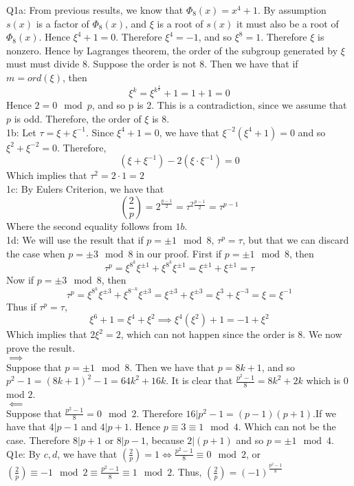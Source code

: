\documentclass[letterpaper]{article}
\begin{document}
\noindent Q1a: From previous results, we know that $\Phi_8(x) = x^4+1$. By assumption $s(x)$ is a factor of $\Phi_8(x)$, and $\xi$ is a root of $s(x)$ it must also be a root of $\Phi_8(x)$. Hence $\xi^4+1=0$. Therefore $\xi^4 = -1$, and so $\xi^8=1$. Therefore $\xi$ is nonzero. Hence by Lagranges theorem, the order of the subgroup generated by $\xi$ must must divide 8. Suppose the order is not 8. Then we have that if $m=ord(\xi)$, then $$\xi^k = \xi^{k^{\frac{4}{k}}}+1=1+1=0$$
Hence $2 = 0\mod{p}$, and so p is 2. This is a contradiction, since we assume that $p$ is odd. Therefore, the order of $\xi$ is 8. 
\newline \\ 1b: Let $\tau = \xi+ \xi^{-1}$. Since $\xi^4+1=0$, we have that $\xi^{-2}(\xi^4+1)=0$ and so $\xi^2+\xi^{-2}=0$. Therefore, $$(\xi+\xi^{-1})-2(\xi\cdot \xi^{-1})=0$$ Which implies that $\tau^2=2\cdot 1 = 2$ 
\newline \\ 1c: By Eulers Criterion, we have that $$(\frac{2}{p}) = 2^{\frac{p-1}{2}} = \tau^{2\frac{p-1}{2}} = \tau^{p-1}$$ Where the second equality follows from $1b$. 
\newline \\ 1d: We will use the result that if $p = \pm 1 \mod{8}$, $\tau^p=\tau$, but that we can discard the case when $p = \pm 3\mod{8}$ in our proof. First if $p=\pm 1\mod{8}$, then $$\tau^p = \xi^{8^k}\xi^{\pm 1}+ \xi^{8^k}\xi^{\pm 1} = \xi^{\pm 1} + \xi^{\pm 1} = \tau$$ Now if $p = \pm 3 \mod{8}$, then $$\tau^p = \xi^{8^k}\xi^{\pm 3} + \xi^{8^{-k}}\xi^{\pm 3} = \xi^{\pm 3} + \xi^{\pm 3} =\xi^3 + \xi^{-3} = \xi = \xi^{-1}$$
Thus if $\tau^p=\tau$, $$\xi^6+1 = \xi^4 + \xi^2 \implies \xi^4(\xi^2)+1 = -1+\xi^2$$
Which implies that $2\xi^2=2$, which can not happen since the order is 8. We now prove the result. 
\newline \\ $\implies$
\newline \\ Suppose that $p = \pm 1 \mod{8}$. Then we have that $p=8k+1$, and so $p^2-1= (8k+1)^2-1 = 64k^2+16k$. It is clear that $\frac{p^2-1}{8} = 8k^2+2k$ which is 0 mod $2$. 
\newline \\ $\impliedby$
\newline \\ Suppose that $\frac{p^2-1}{8} = 0\mod{2}$. Therefore $16|p^2-1 = (p-1)(p+1)$.If we have that $4|p-1$ and $4|p+1$. Hence $p\equiv 3\equiv 1\mod{4}$. Which can not be the case. Therefore $8|p+1$ or $8|p-1$, because $2|(p+1)$ and so $p = \pm 1 \mod{4}$. 
\newline \\ Q1e: By $c,d$, we have that $(\frac{2}{p})=1 \iff \frac{p^2-1}{8}\equiv 0 \mod{2}$, or $(\frac{2}{p}) \equiv -1 \mod{2} \equiv \frac{p^2-1}{8}\equiv 1 \mod{2}$. Thus, $(\frac{2}{p}) = (-1)^{\frac{p^2-1}{8}}$   
\end{document}
